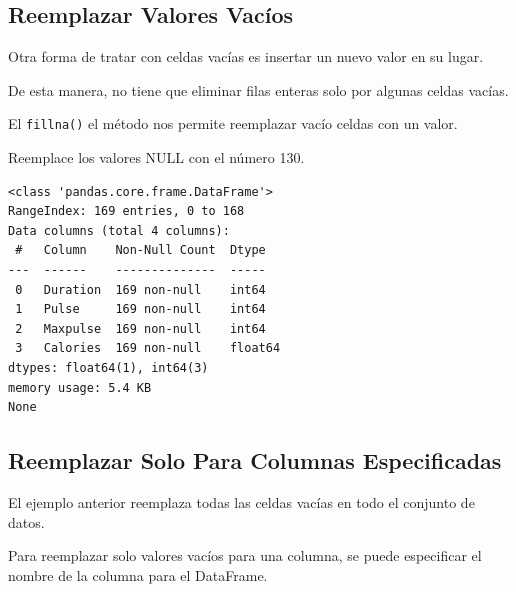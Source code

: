 \subsection{Reemplazar Valores Vacíos}

Otra forma de tratar con celdas vacías es insertar un nuevo valor en su
lugar.

De esta manera, no tiene que eliminar filas enteras solo por algunas
celdas vacías.

El \texttt{fillna()} el método nos permite reemplazar vacío celdas con
un valor.\\

\begin{code} Reemplace los valores NULL con el número 130.

\begin{Shaded}
\begin{Highlighting}[]

\OperatorTok{=}\NormalTok{)}

\OperatorTok{=} \NormalTok{)}

\end{Highlighting}
\end{Shaded}

\begin{verbatim}
<class 'pandas.core.frame.DataFrame'>
RangeIndex: 169 entries, 0 to 168
Data columns (total 4 columns):
 #   Column    Non-Null Count  Dtype  
---  ------    --------------  -----  
 0   Duration  169 non-null    int64  
 1   Pulse     169 non-null    int64  
 2   Maxpulse  169 non-null    int64  
 3   Calories  169 non-null    float64
dtypes: float64(1), int64(3)
memory usage: 5.4 KB
None
\end{verbatim}
\end{code}

\subsection{Reemplazar Solo Para Columnas Especificadas}

El ejemplo anterior reemplaza todas las celdas vacías en todo el
conjunto de datos.

Para reemplazar solo valores vacíos para una columna, se puede
especificar el nombre de la columna para el DataFrame.\\

